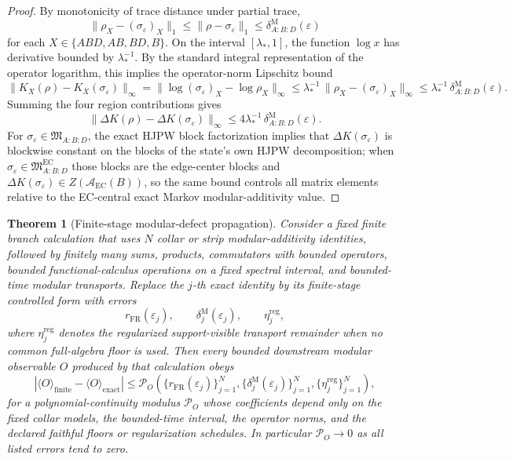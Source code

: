 \documentclass[11pt]{article}
\newtheorem{theorem}{Theorem}[section]
\begin{document}
\begin{proof}
By monotonicity of trace distance under partial trace,
\[
\|\rho_X-(\sigma_\varepsilon)_X\|_1
\le
\|\rho-\sigma_\varepsilon\|_1
\le
\delta^{\mathrm M}_{A:B:D}(\varepsilon)
\]
for each \(X\in\{ABD,AB,BD,B\}\). On the interval \([\lambda_\ast,1]\), the function \(\log x\) has derivative bounded by \(\lambda_\ast^{-1}\). By the standard integral representation of the operator logarithm, this implies the operator-norm Lipschitz bound
\[
\|K_X(\rho)-K_X(\sigma_\varepsilon)\|_\infty
=
\|\log (\sigma_\varepsilon)_X-\log \rho_X\|_\infty
\le
\lambda_\ast^{-1}\,\|\rho_X-(\sigma_\varepsilon)_X\|_\infty
\le
\lambda_\ast^{-1}\,\delta^{\mathrm M}_{A:B:D}(\varepsilon).
\]
Summing the four region contributions gives
\[
\|\Delta K(\rho)-\Delta K(\sigma_\varepsilon)\|_\infty
\le
4\lambda_\ast^{-1}\,\delta^{\mathrm M}_{A:B:D}(\varepsilon).
\]
For \(\sigma_\varepsilon\in \mathfrak M_{A:B:D}\), the exact HJPW block factorization implies that \(\Delta K(\sigma_\varepsilon)\) is blockwise constant on the blocks of the state's own HJPW decomposition; when \(\sigma_\varepsilon\in\mathfrak M^{\mathrm{EC}}_{A:B:D}\) those blocks are the edge-center blocks and \(\Delta K(\sigma_\varepsilon)\in Z(\mathcal A_{\mathrm{EC}}(B))\), so the same bound controls all matrix elements relative to the EC-central exact Markov modular-additivity value.
\end{proof}

\begin{theorem}[Finite-stage modular-defect propagation]\label{thm:modular-defect-propagation}
Consider a fixed finite branch calculation that uses \(N\) collar or strip
modular-additivity identities, followed by finitely many sums, products,
commutators with bounded operators, bounded functional-calculus operations on
a fixed spectral interval, and bounded-time modular transports. Replace the
\(j\)-th exact identity by its finite-stage controlled form with errors
\[
r_{\mathrm{FR}}(\varepsilon_j),\qquad
\delta^{\mathrm M}_j(\varepsilon_j),\qquad
\eta^{\mathrm{reg}}_j,
\]
where \(\eta^{\mathrm{reg}}_j\) denotes the regularized support-visible
transport remainder when no common full-algebra floor is used. Then every
bounded downstream modular observable \(O\) produced by that calculation obeys
\[
\left|
\langle O\rangle_{\mathrm{finite}}
-
\langle O\rangle_{\mathrm{exact}}
\right|
\le
\mathcal P_O\!\left(
\{r_{\mathrm{FR}}(\varepsilon_j)\}_{j=1}^N,
\{\delta^{\mathrm M}_j(\varepsilon_j)\}_{j=1}^N,
\{\eta^{\mathrm{reg}}_j\}_{j=1}^N
\right),
\]
for a polynomial-continuity modulus \(\mathcal P_O\) whose coefficients depend
only on the fixed collar models, the bounded-time interval, the operator norms,
and the declared faithful floors or regularization schedules. In particular
\(\mathcal P_O\to0\) as all listed errors tend to zero.
\end{theorem}
\end{document}
